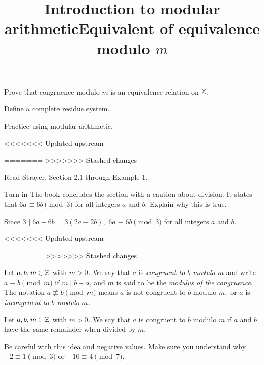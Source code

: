 \documentclass{ximera}
\title{Introduction to modular arithmetic}
\title{Equivalent of equivalence modulo $m$}
\begin{document}
\begin{abstract}
\end{abstract}
\maketitle

\begin{obj}
\item Prove that congruence modulo $m$ is an equivalence relation on $\mathbb Z$.
\item Define a complete residue system.
\item Practice using modular arithmetic.
\end{obj}
<<<<<<< Updated upstream


\begin{instructorNotes}
=======
>>>>>>> Stashed changes
    
\begin{pre}
    \item[Read] Strayer, Section 2.1 through Example 1.
    \item[Turn in] The book concludes the section with a caution about division. It states that $6a\equiv 6b \pmod 3$ for all integers $a$ and $b$. Explain why this is true.
    
    
    \begin{solution}
        Since $3\mid 6a-6b=3(2a-2b),$ $6a\equiv 6b \pmod 3$ for all integers $a$ and $b$.
    \end{solution}
    \end{pre}

<<<<<<< Updated upstream
\end{instructorNotes}



=======
>>>>>>> Stashed changes
\begin{defn}\label{defn:mod-divides} Let $a,b,m\in\mathbb Z$ with $m>0.$
We say that $a$ is \emph{congruent to $b$ modulo $m$} and write $a \equiv b \pmod{m}$ if $m\mid b-a$, and $m$ is said to be the \emph{modulus of the congruence}. The notation $a\not\equiv b\pmod m$ means $a$ is not congruent to $b$ modulo $m,$ or $a$ is \emph{incongruent to $b$ modulo $m$.} 
\end{defn}

\begin{defn}\label{defn:mod-remainder} Let $a,b,m\in\mathbb Z$ with $m>0.$ We say that $a$ is congruent to $b$ modulo $m$ if $a$ and $b$ have the same remainder when divided by $m$. 
\end{defn}
Be careful with this idea and negative values. Make sure you understand why $-2\equiv 1\pmod{3}$ or $-10\equiv 4\pmod{7}$.
\end{document}
